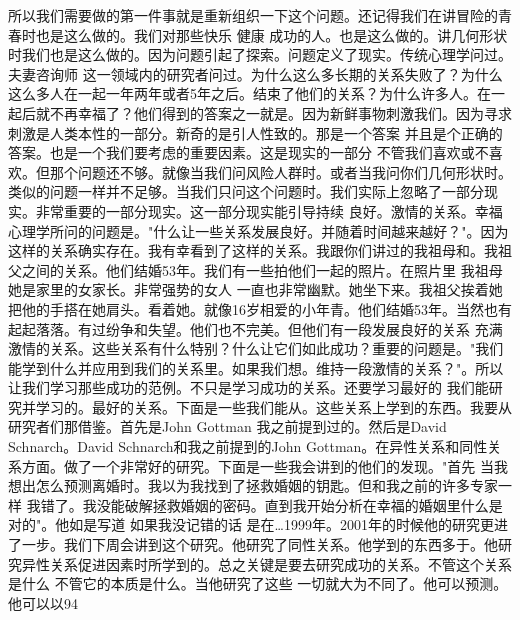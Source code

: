 所以我们需要做的第一件事就是重新组织一下这个问题。还记得我们在讲冒险的青春时也是这么做的。我们对那些快乐 健康 成功的人。也是这么做的。讲几何形状时我们也是这么做的。因为问题引起了探索。问题定义了现实。传统心理学问过。夫妻咨询师 这一领域内的研究者问过。为什么这么多长期的关系失败了？为什么这么多人在一起一年两年或者5年之后。结束了他们的关系？为什么许多人。在一起后就不再幸福了？他们得到的答案之一就是。因为新鲜事物刺激我们。因为寻求刺激是人类本性的一部分。新奇的是引人性致的。那是一个答案 并且是个正确的答案。也是一个我们要考虑的重要因素。这是现实的一部分 不管我们喜欢或不喜欢。但那个问题还不够。就像当我们问风险人群时。或者当我问你们几何形状时。类似的问题一样并不足够。当我们只问这个问题时。我们实际上忽略了一部分现实。非常重要的一部分现实。这一部分现实能引导持续 良好。激情的关系。幸福心理学所问的问题是。"什么让一些关系发展良好。并随着时间越来越好？"。因为这样的关系确实存在。我有幸看到了这样的关系。我跟你们讲过的我祖母和。我祖父之间的关系。他们结婚53年。我们有一些拍他们一起的照片。在照片里 我祖母 她是家里的女家长。非常强势的女人 一直也非常幽默。她坐下来。我祖父挨着她 把他的手搭在她肩头。看着她。就像16岁相爱的小年青。他们结婚53年。当然也有起起落落。有过纷争和失望。他们也不完美。但他们有一段发展良好的关系 充满激情的关系。这些关系有什么特别？什么让它们如此成功？重要的问题是。"我们能学到什么并应用到我们的关系里。如果我们想。维持一段激情的关系？"。所以让我们学习那些成功的范例。不只是学习成功的关系。还要学习最好的 我们能研究并学习的。最好的关系。下面是一些我们能从。这些关系上学到的东西。我要从研究者们那借鉴。首先是John Gottman 我之前提到过的。然后是David Schnarch。David Schnarch和我之前提到的John Gottman。在异性关系和同性关系方面。做了一个非常好的研究。下面是一些我会讲到的他们的发现。"首先 当我想出怎么预测离婚时。我以为我找到了拯救婚姻的钥匙。但和我之前的许多专家一样 我错了。我没能破解拯救婚姻的密码。直到我开始分析在幸福的婚姻里什么是对的"。他如是写道 如果我没记错的话 是在…1999年。2001年的时候他的研究更进了一步。我们下周会讲到这个研究。他研究了同性关系。他学到的东西多于。他研究异性关系促进因素时所学到的。总之关键是要去研究成功的关系。不管这个关系是什么 不管它的本质是什么。当他研究了这些 一切就大为不同了。他可以预测。他可以以94%